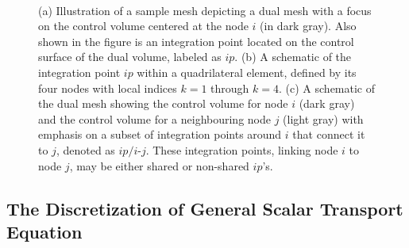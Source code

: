 \documentclass[12pt]{extarticle}
\newcommand{\<}{\langle}
\renewcommand{\>}{\rangle}
\theoremstyle{definition}
\begin{document}
\begin{figure}
    \centering
     \quad\quad
     \\
    \caption{(a) Illustration of a sample mesh depicting a dual mesh with a focus on the control volume centered at the node $i$ (in dark gray). Also shown in the figure is an integration point located on the control surface of the dual volume, labeled as $ip$. (b) A schematic of the integration point $ip$ within a quadrilateral element, defined by its four nodes with local indices $k=1$ through $k=4$. (c) A schematic of the dual mesh showing the control volume for node $i$ (dark gray) and the control volume for a neighbouring node $j$ (light gray) with emphasis on a subset of integration points around $i$ that connect it to $j$, denoted as $ip/i\text{-}j$. These integration points, linking node $i$ to node $j$, may be either shared or non-shared $ip$'s.}
    \label{CVFEM}
\end{figure}

\subsection{The Discretization of General Scalar Transport Equation}
\end{document}
